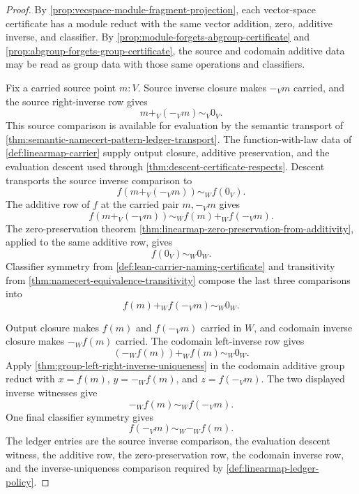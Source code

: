 \begin{proof}
By \autoref{prop:vecspace-module-fragment-projection}, each vector-space certificate has a module reduct with the same vector addition, zero, additive inverse, and classifier. By \autoref{prop:module-forgets-abgroup-certificate} and \autoref{prop:abgroup-forgets-group-certificate}, the source and codomain additive data may be read as group data with those same operations and classifiers.

Fix a carried source point $m:V$. Source inverse closure makes $-_V m$ carried, and the source right-inverse row gives
$$
m+_V(-_V m)\sim_V0_V.
$$
This source comparison is available for evaluation by the semantic transport of \autoref{thm:semantic-namecert-pattern-ledger-transport}. The function-with-law data of \autoref{def:linearmap-carrier} supply output closure, additive preservation, and the evaluation descent used through \autoref{thm:descent-certificate-respects}. Descent transports the source inverse comparison to
$$
f(m+_V(-_V m))\sim_W f(0_V).
$$
The additive row of $f$ at the carried pair $m,-_V m$ gives
$$
f(m+_V(-_V m))\sim_W f(m)+_W f(-_V m).
$$
The zero-preservation theorem \autoref{thm:linearmap-zero-preservation-from-additivity}, applied to the same additive row, gives
$$
f(0_V)\sim_W0_W.
$$
Classifier symmetry from \autoref{def:lean-carrier-naming-certificate} and transitivity from \autoref{thm:namecert-equivalence-transitivity} compose the last three comparisons into
$$
f(m)+_W f(-_V m)\sim_W0_W.
$$

Output closure makes $f(m)$ and $f(-_V m)$ carried in $W$, and codomain inverse closure makes $-_W f(m)$ carried. The codomain left-inverse row gives
$$
(-_W f(m))+_W f(m)\sim_W0_W.
$$
Apply \autoref{thm:group-left-right-inverse-uniqueness} in the codomain additive group reduct with $x=f(m)$, $y=-_W f(m)$, and $z=f(-_V m)$. The two displayed inverse witnesses give
$$
-_W f(m)\sim_W f(-_V m).
$$
One final classifier symmetry gives
$$
f(-_V m)\sim_W-_W f(m).
$$
The ledger entries are the source inverse comparison, the evaluation descent witness, the additive row, the zero-preservation row, the codomain inverse row, and the inverse-uniqueness comparison required by \autoref{def:linearmap-ledger-policy}.
\end{proof}

